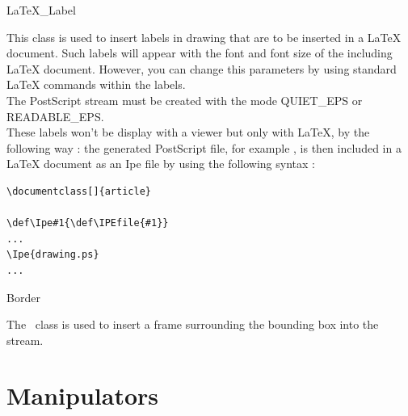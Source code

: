 \begin{ccClass}{LaTeX_Label}

\ccDefinition
This class is used to insert labels in drawing that are to be inserted 
in a LaTeX document.
Such labels will appear with the font and font size of the including
LaTeX document.
However, you can
change this parameters by using standard LaTeX commands within the labels.\\
The PostScript stream must be created with the mode QUIET\_EPS or READABLE\_EPS.\\
These labels won't be display with a viewer but only with LaTeX, by
the following way :
the generated PostScript file, for example , is then
included in a LaTeX document as an {\sc Ipe} file by using the
following syntax :

\begin{verbatim}
\documentclass[]{article}

\def\Ipe#1{\def\IPEfile{#1}}
...
\Ipe{drawing.ps}
...

\end{verbatim}


\ccCreation
{}



\end{ccClass}

\begin{ccClass}{Border}

\ccDefinition
The \ccClassName\ class is used to insert a frame surrounding the bounding box
into the stream.

\ccCreation
{}


\ccAccessFunctions

\ccGlue

\end{ccClass}
\par


\section{Manipulators}

